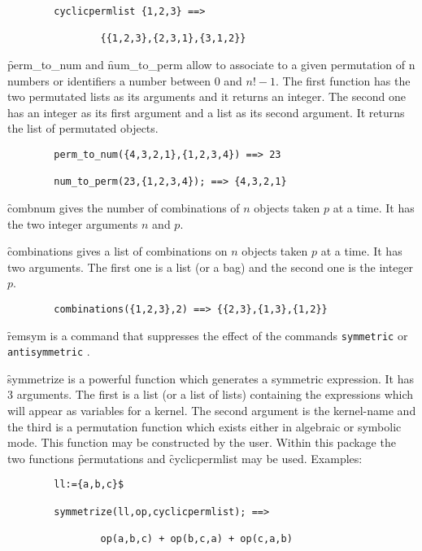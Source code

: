 \begin{itemize}
\begin{verbatim}
        cyclicpermlist {1,2,3} ==>

                {{1,2,3},{2,3,1},{3,1,2}}
\end{verbatim}
\hypertarget{operator:PERM_TO_NUM}{}
\hypertarget{operator:NUM_TO_PERM}{}
\f{perm\_to\_num} and \f{num\_to\_perm} allow to associate to a given 
permutation of n numbers or identifiers a number between $0$ and 
$n! - 1$. The first function has the two permutated lists  
as its arguments and it returns an integer. The second one has an integer  
as its first argument and a list as its second argument. It returns the 
list of permutated objects.
\begin{verbatim}
        perm_to_num({4,3,2,1},{1,2,3,4}) ==> 23

        num_to_perm(23,{1,2,3,4}); ==> {4,3,2,1}
\end{verbatim}
\hypertarget{operator:COMBNUM}{}
\f{combnum} gives the number of combinations of $n$ objects
taken $p$ at a time. It has the two integer arguments $n$ and $p$.

\hypertarget{operator:COMBINATIONS}{}
\f{combinations} gives a list of combinations on $n$ objects taken $p$
at a time. It has two arguments. The first one is a list (or a bag) and
the second one is the integer $p$.
\begin{verbatim}
        combinations({1,2,3},2) ==> {{2,3},{1,3},{1,2}}
\end{verbatim}
\f{remsym} is a command that suppresses the effect of the \REDUCE commands
\texttt{symmetric} or \texttt{antisymmetric} .

\hypertarget{operator:SYMMETRIZE}{}
\f{symmetrize} is a powerful function which generates a symmetric expression.
It has 3 arguments. The first is a list (or a list of lists) containing
the expressions which will appear as variables for a kernel. The second
argument is the kernel-name and the third is a permutation function
which exists either in algebraic or symbolic mode. This
function may be constructed by the user. Within this package
the two functions \f{permutations} and \f{cyclicpermlist} may be used.
Examples:
\begin{verbatim}
        ll:={a,b,c}$

        symmetrize(ll,op,cyclicpermlist); ==>

                op(a,b,c) + op(b,c,a) + op(c,a,b)


\end{verbatim}
\end{itemize}
